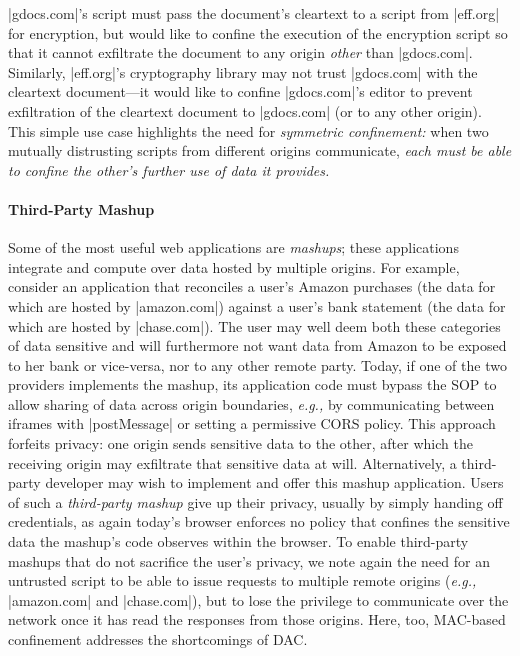 \js|gdocs.com|'s script must pass the document's cleartext to a script
from \js|eff.org| for encryption, but would like to confine the
execution of the encryption script so that it cannot exfiltrate the
document to any origin {\em other} than \js|gdocs.com|. Similarly,
\js|eff.org|'s cryptography library may not trust \js|gdocs.com| with
the cleartext document---it would like to confine \js|gdocs.com|'s
editor to prevent exfiltration of the cleartext document to
\js|gdocs.com| (or to any other origin).
%
This simple use case highlights the need for {\em
  symmetric confinement:} when two mutually distrusting scripts from
different origins communicate, {\em each must be able to confine the
  other's further use of data it provides.}
%


\paragraph{Third-Party Mashup}
Some of the most useful web applications are {\em mashups}; these
applications integrate and compute over data hosted by multiple
origins. For example, consider an application that reconciles a user's
Amazon purchases (the data for which are hosted by \js|amazon.com|)
against a user's bank statement (the data for which are hosted by
\js|chase.com|). The user may well deem both these categories of data
sensitive and will furthermore not want data from Amazon to be
exposed to her bank or vice-versa, nor to any other remote party.
Today, if one of the two providers implements the mashup, its
application code must bypass the SOP to allow sharing of data across
origin boundaries, \emph{e.g.,} by communicating between iframes with
\js|postMessage| or setting a permissive CORS policy.  This approach
forfeits privacy: one origin sends sensitive data to the other, after
which the receiving origin may exfiltrate that sensitive data at will.
Alternatively, a third-party developer may wish to implement and offer
this mashup application. Users of such a {\em third-party mashup} give
up their privacy, usually by simply handing off credentials, as again
today's browser enforces no policy that confines the sensitive data
the mashup's code observes within the browser. To enable third-party
mashups that do not sacrifice the user's privacy, we note again the
need for an untrusted script to be able to issue requests to multiple
remote origins (\emph{e.g.,} \js|amazon.com| and \js|chase.com|), but
to lose the privilege to communicate over the network once it has read
the responses from those origins. Here, too, MAC-based confinement
addresses the shortcomings of DAC. 

